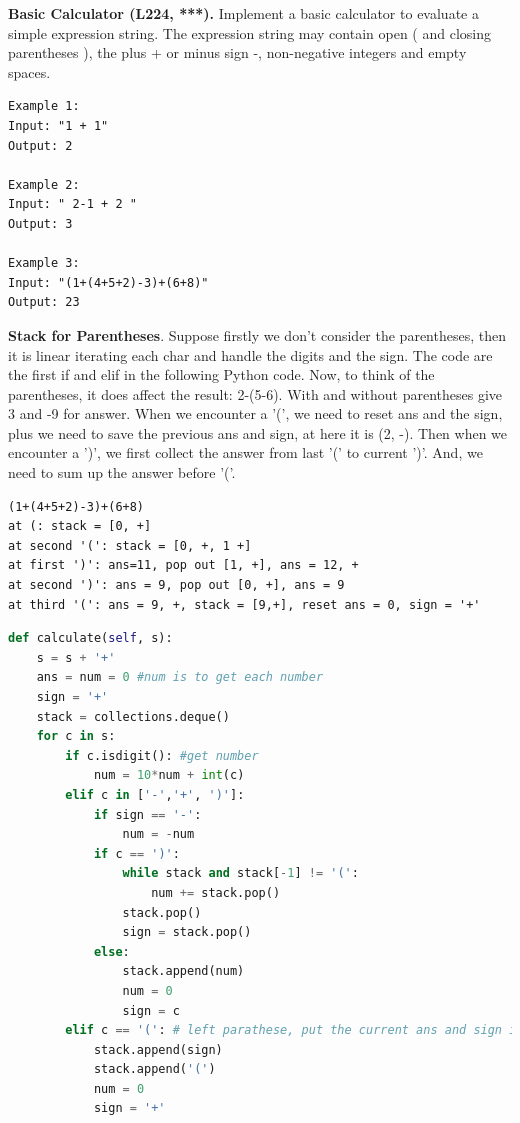 \documentclass[../main.tex]{subfiles}
\begin{document}
\begin{examples}[resume]
\item \textbf{Basic Calculator (L224, ***).} Implement a basic calculator to evaluate a simple expression string. The expression string may contain open ( and closing parentheses ), the plus + or minus sign -, non-negative integers and empty spaces.
\begin{lstlisting}[numbers=none]
Example 1:
Input: "1 + 1"
Output: 2

Example 2:
Input: " 2-1 + 2 "
Output: 3

Example 3:
Input: "(1+(4+5+2)-3)+(6+8)"
Output: 23
\end{lstlisting}
\textbf{Stack for Parentheses}. Suppose firstly we don't consider the parentheses, then it is linear iterating each char and handle the digits and the sign. The code are the first if and elif in the following Python code. Now, to think of the parentheses, it does affect the result: 2-(5-6). With and without parentheses give 3 and -9 for answer. When we encounter a '(', we need to reset ans and the sign, plus we need to save the previous ans and sign, at here it is (2, -). Then when we encounter a ')', we first collect the answer from last '(' to current ')'. And, we need to sum up the answer before '('. 
\begin{lstlisting}[numbers=none]
(1+(4+5+2)-3)+(6+8)
at (: stack = [0, +]
at second '(': stack = [0, +, 1 +]
at first ')': ans=11, pop out [1, +], ans = 12, +
at second ')': ans = 9, pop out [0, +], ans = 9
at third '(': ans = 9, +, stack = [9,+], reset ans = 0, sign = '+'
\end{lstlisting}
\begin{lstlisting}[language=Python]
def calculate(self, s):
    s = s + '+'
    ans = num = 0 #num is to get each number 
    sign = '+'
    stack = collections.deque()
    for c in s:
        if c.isdigit(): #get number
            num = 10*num + int(c)
        elif c in ['-','+', ')']:
            if sign == '-':
                num = -num
            if c == ')':
                while stack and stack[-1] != '(':
                    num += stack.pop()
                stack.pop()
                sign = stack.pop()
            else:
                stack.append(num)
                num = 0
                sign = c
        elif c == '(': # left parathese, put the current ans and sign in the stack
            stack.append(sign)
            stack.append('(')
            num = 0
            sign = '+'


\end{lstlisting}
\end{examples}
\end{document}
